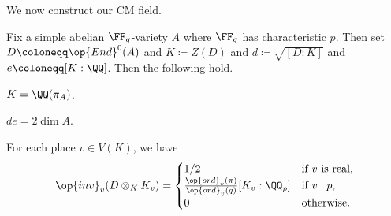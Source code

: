 \documentclass[../notes.tex]{subfiles}
\begin{document}
We now construct our CM field.
\begin{theorem} \label{thm:div-alg-of-simple-av-fq}
	Fix a simple abelian $\FF_q$-variety $A$ where $\FF_q$ has characteristic $p$. Then set $D\coloneqq\op{End}^0(A)$ and $K\coloneqq Z(D)$ and $d\coloneqq\sqrt{[D:K]}$ and $e\coloneqq[K:\QQ]$. Then the following hold.
	\begin{listalph}
		\item $K=\QQ(\pi_A)$.
		\item $de=2\dim A$.
		\item For each place $v\in V(K)$, we have
		\[\op{inv}_v(D\otimes_KK_v)=\begin{cases}
			1/2 & \text{if }v\text{ is real}, \\
			\frac{\op{ord}_v(\pi)}{\op{ord}_v(q)}[K_v:\QQ_p] & \text{if }v\mid p, \\
			0 & \text{otherwise}.
		\end{cases}\]
	\end{listalph}
\end{theorem}
\end{document}
